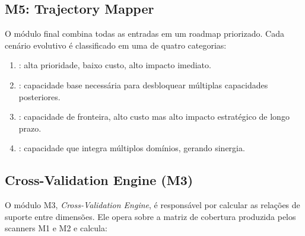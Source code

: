 \begin{table}[htb]
\centering
    \small
\caption{Analogias polimáticas para lacunas epistemológicas}
\label{tab:polymathic}
\end{table}

\subsection{M5: Trajectory Mapper}

O módulo final combina todas as entradas em um roadmap priorizado. Cada
cenário evolutivo é classificado em uma de quatro categorias:

\begin{enumerate}
\item {}: alta prioridade, baixo custo, alto impacto
imediato.
\item {}: capacidade base necessária para desbloquear
múltiplas capacidades posteriores.
\item {}: capacidade de fronteira, alto custo mas alto
impacto estratégico de longo prazo.
\item {}: capacidade que integra múltiplos domínios,
gerando sinergia.
\end{enumerate}

\subsection{Cross-Validation Engine (M3)}

O módulo M3, \emph{Cross-Validation Engine}, é responsável por calcular as
relações de suporte entre dimensões. Ele opera sobre a matriz de cobertura
produzida pelos scanners M1 e M2 e calcula:

